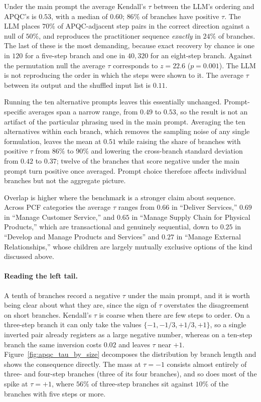 Under the main prompt the average Kendall's $\tau$ between the LLM's ordering and APQC's is $0.53$, with a median of $0.60$; $86\%$ of branches have positive $\tau$.
The LLM places $70\%$ of APQC-adjacent step pairs in the correct direction against a null of $50\%$, and reproduces the practitioner sequence \emph{exactly} in $24\%$ of branches.
The last of these is the most demanding, because exact recovery by chance is one in $120$ for a five-step branch and one in $40{,}320$ for an eight-step branch.
Against the permutation null the average $\tau$ corresponds to $z = 22.6$ ($p = 0.001$).
The LLM is not reproducing the order in which the steps were shown to it. The average $\tau$ between its output and the shuffled input list is $0.11$.

Running the ten alternative prompts leaves this essentially unchanged.
Prompt-specific averages span a narrow range, from $0.49$ to $0.53$, so the result is not an artifact of the particular phrasing used in the main prompt.
Averaging the ten alternatives within each branch, which removes the sampling noise of any single formulation, leaves the mean at $0.51$ while raising the share of branches with positive $\tau$ from $86\%$ to $90\%$ and lowering the cross-branch standard deviation from $0.42$ to $0.37$; twelve of the branches that score negative under the main prompt turn positive once averaged.
Prompt choice therefore affects individual branches but not the aggregate picture.

Overlap is higher where the benchmark is a stronger claim about sequence.
Across PCF categories the average $\tau$ ranges from $0.66$ in ``Deliver Services,'' $0.69$ in ``Manage Customer Service,'' and $0.65$ in ``Manage Supply Chain for Physical Products,'' which are transactional and genuinely sequential, down to $0.25$ in ``Develop and Manage Products and Services'' and $0.27$ in ``Manage External Relationships,'' whose children are largely mutually exclusive options of the kind discussed above.

\paragraph{Reading the left tail.}
\label{app:apqc_validation_tail}
A tenth of branches record a negative $\tau$ under the main prompt, and it is worth being clear about what they are, since the sign of $\tau$ overstates the disagreement on short branches.
Kendall's $\tau$ is coarse when there are few steps to order. On a three-step branch it can only take the values $\{-1, -1/3, +1/3, +1\}$, so a single inverted pair already registers as a large negative number, whereas on a ten-step branch the same inversion costs $0.02$ and leaves $\tau$ near $+1$.
Figure~\ref{fig:apqc_tau_by_size} decomposes the distribution by branch length and shows the consequence directly. The mass at $\tau = -1$ consists almost entirely of three- and four-step branches (three of its four branches), and so does most of the spike at $\tau = +1$, where $56\%$ of three-step branches sit against $10\%$ of the branches with five steps or more.

